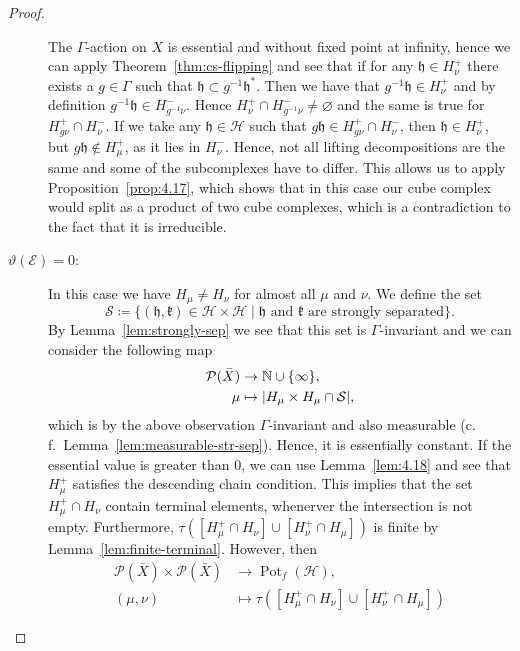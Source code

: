 \begin{proof}
\begin{description}
    The \(\Gamma\)-action on \(X\) is essential and without fixed point at infinity, hence we can apply Theorem~\ref{thm:cs-flipping} and see that if for any \(\mathfrak{h} \in H_{\nu}^+\) there exists a \(g \in \Gamma\) such that \(\mathfrak{h} \subset g^{-1}\mathfrak{h}^\ast \). Then we have that \(g^{-1}\mathfrak{h} \in H_\nu^+\) and by definition \(g^{-1} \mathfrak{h} \in H_{g^{-1}\nu}^-\). Hence \(H_\nu^+ \cap H_{g^{-1}\nu}^- \neq \varnothing\) and the same is true for \(H_{g\nu}^+ \cap H_{\nu}^-\). If we take any \(\mathfrak{h} \in \mathcal{H}\) such that \(g\mathfrak{h} \in H_{g\nu}^+ \cap H_\nu^-\), then \(\mathfrak{h} \in H_{\nu}^+\), but \(g\mathfrak{h} \not \in H_\mu^+\), as it lies in \(H_\nu^-\). Hence, not all lifting decompositions are the same and some of the subcomplexes have to differ. This allows us to apply Proposition~\ref{prop:4.17}, which shows that in this case our cube complex would split as a product of two cube complexes, which is a contradiction to the fact that it is irreducible.
  \item[\(\vartheta(\mathcal{E})=0\):] In this case we have \(H_\mu \neq H_\nu\) for almost all \(\mu\) and \(\nu\). We define the set
    \[
      \mathcal{S} \coloneqq \{(\mathfrak{h}, \mathfrak{k}) \in \mathcal{H} \times \mathcal{H} \mid \mathfrak{h} \text{ and } \mathfrak{k} \text{ are strongly separated}\}.
    \]
    By Lemma~\ref{lem:strongly-sep} we see that this set is \(\Gamma\)-invariant and we can consider the following map
    \begin{align*}
      \mathcal{P}(\bar X) &\to \mathbb{N} \cup \{\infty\},\\
      \mu &\mapsto |H_\mu \times H_\mu \cap \mathcal{S}|,
    \end{align*}
    which is by the above observation \(\Gamma\)-invariant and also measurable (c.\,f.\ Lemma~\ref{lem:measurable-str-sep}). Hence, it is essentially constant. If the essential value is greater than 0, we can use Lemma~\ref{lem:4.18} and see that \(H_\mu^+\) satisfies the descending chain condition. This implies that the set \(H_\mu^+ \cap H_\nu\) contain terminal elements, whenerver the intersection is not empty. Furthermore, \(\tau([H_\mu^+ \cap H_\nu] \cup [H_\nu^+ \cap H_\mu])\) is finite by Lemma~\ref{lem:finite-terminal}. However, then
    \begin{align*}
      \mathcal{P}(\bar X) \times \mathcal{P}(\bar X) &\to \operatorname{Pot}_f(\mathcal{H}),\\
      (\mu,\nu) &\mapsto \tau([H_\mu^+ \cap H_\nu] \cup [H_\nu^+ \cap H_\mu])
    \end{align*}

\end{description}
\end{proof}
